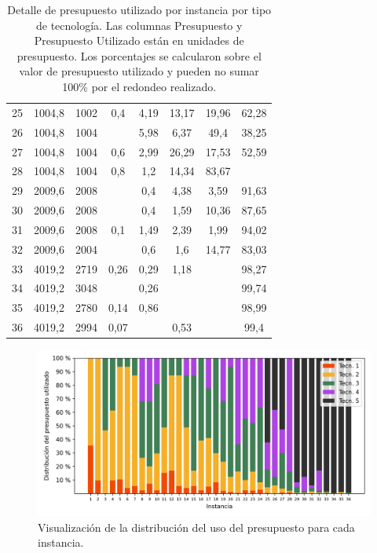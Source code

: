 \begin{table}
\begin{tabular}{cccccccc}
      25 & 1004,8 & 1002 & 0,4 & 4,19 & 13,17 & 19,96 & 62,28 \\
      26 & 1004,8 & 1004 &  & 5,98 & 6,37 & 49,4 & 38,25 \\
      27 & 1004,8 & 1004 & 0,6 & 2,99 & 26,29 & 17,53 & 52,59 \\
      28 & 1004,8 & 1004 & 0,8 & 1,2 & 14,34 & 83,67 &  \\
      29 & 2009,6 & 2008 &  & 0,4 & 4,38 & 3,59 & 91,63 \\
      30 & 2009,6 & 2008 &  & 0,4 & 1,59 & 10,36 & 87,65 \\
      31 & 2009,6 & 2008 & 0,1 & 1,49 & 2,39 & 1,99 & 94,02 \\
      32 & 2009,6 & 2004 &  & 0,6 & 1,6 & 14,77 & 83,03 \\
      33 & 4019,2 & 2719 & 0,26 & 0,29 & 1,18 &  & 98,27 \\
      34 & 4019,2 & 3048 &  & 0,26 &  &  & 99,74 \\
      35 & 4019,2 & 2780 & 0,14 & 0,86 &  &  & 98,99 \\
      36 & 4019,2 & 2994 & 0,07 &  & 0,53 &  & 99,4 \\
      \bottomrule
  \end{tabular}
  \caption{Detalle de presupuesto utilizado por instancia por tipo de tecnología. Las columnas Presupuesto y Presupuesto Utilizado están en unidades de presupuesto. Los porcentajes se calcularon sobre el valor de presupuesto utilizado y pueden no sumar 100\% por el redondeo realizado.} \label{table:sensibilitybudgetusage}
\end{table}

\begin{figure}[h!]
  \centering
  \includegraphics[width=14cm]{../resources/budget_use_by_infra.png}
  \caption{Visualización de la distribución del uso del presupuesto para cada instancia.}
  \label{fig:sensibilitybudgetusage}
\end{figure}

